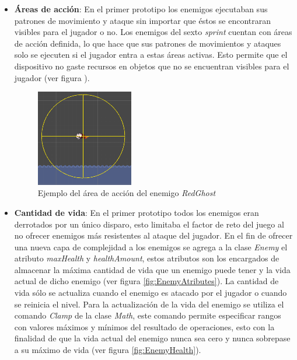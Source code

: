     \begin{itemize}
         \item \textbf{Áreas de acción}: En el primer prototipo los enemigos ejecutaban
         sus patrones de movimiento y ataque sin importar que éstos se encontraran
         visibles para el jugador o no. Los enemigos del sexto \textit{sprint}
         cuentan con áreas de acción definida, lo que hace que sus patrones de
         movimientos y ataques solo se ejecuten si el jugador entra a estas áreas
         activas. Esto permite que el dispositivo no gaste recursos en objetos que no se
         encuentran visibles para el jugador (ver figura ).
        
             \begin{figure}[h]
                    \centering
                    \includegraphics[width=0.4\textwidth]{03TrabajoRealizado/imagenes/EnemyRaycasting.png}
                    \caption{Ejemplo del área de acción del enemigo \textit{RedGhost}}
                    \label{fig:EnemyArea}
                \end{figure}
           
         \item \textbf{Cantidad de vida}: En el primer prototipo todos los enemigos
         eran derrotados por un único disparo, esto limitaba el factor de reto del
         juego al no ofrecer enemigos más resistentes al ataque del jugador. En el
         fin de ofrecer una nueva capa de complejidad a los enemigos se agrega a la
         clase \textit{Enemy} el atributo \textit{maxHealth} y \textit{healthAmount},
         estos atributos son los encargados de almacenar la máxima cantidad de vida
         que un enemigo puede tener y la vida actual de dicho enemigo (ver figura
         \ref{fig:EnemyAtributes}). La cantidad de
         vida sólo se actualiza cuando el enemigo es atacado por el jugador o cuando
         se reinicia el nivel. Para la actualización de la vida del enemigo se utiliza
         el comando \textit{Clamp} de la clase \textit{Math}, este comando permite
         especificar rangos con valores máximos y mínimos del resultado de operaciones,
         esto con la finalidad de que la vida actual del enemigo nunca sea cero y nunca
         sobrepase a su máximo de vida (ver figura \ref{fig:EnemyHealth}).
        

\end{itemize}
